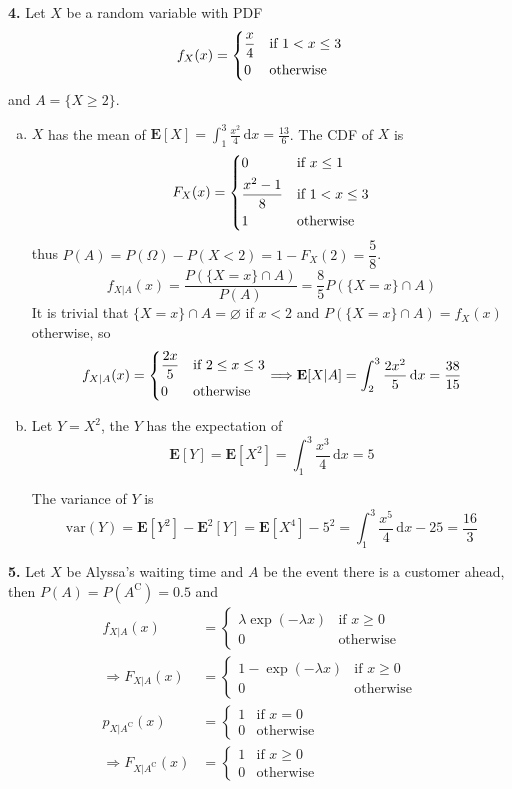 \documentclass[a4paper,12pt]{article}
\newcommand{\E}{\mathbf E}
\newcommand{\C}{\mathrm C}
\newcommand{\ud}{\,\mathrm{d}}
\newcommand{\var}{\mathrm{var}}
\newcommand{\exercise}[1]{\noindent\textbf{#1.}}
\begin{document}
\exercise 4  Let $X$ be a random variable with PDF
\[f_X(x) = \begin{dcases}
  \frac{x}{4} &\text{if }1 < x \le 3\\
  0 &\text{otherwise}
\end{dcases}\]
and $A = \{X \ge 2\}$.
\begin{enumerate}[(a)]
  \item $X$ has the mean of
    $\displaystyle\E[X] = \int_1^3\frac{x^2}{4}\ud x = \frac{13}{6}$.
    The CDF of $X$ is
    \[F_X(x) = \begin{dcases}
      0 &\text{if }x \le 1\\
      \frac{x^2 - 1}{8} &\text{if }1 < x \le 3\\
      1 &\text{otherwise}
    \end{dcases}\]
    thus $P(A) = P(\Omega) - P(X < 2) = 1 - F_X(2) = \dfrac{5}{8}$.
    \[f_{X|A}(x) = \frac{P(\{X = x\}\cap A)}{P(A)}
    = \frac{8}{5}P(\{X = x\}\cap A)\]
    It is trivial that $\{X = x\}\cap A = \varnothing$ if $x < 2$
    and $P(\{X = x\}\cap A) = f_X(x)$ otherwise, so
    \[f_{X|A}(x) = \begin{dcases}
      \frac{2x}{5} &\text{if }2 \le x \le 3\\
      0 &\text{otherwise}
    \end{dcases}
    \Longrightarrow \E[X|A] = \int_2^3\frac{2x^2}{5}\ud x = \frac{38}{15}\]
  \item Let $Y = X^2$, the $Y$ has the expectation of
    \[\E[Y] = \E\left[X^2\right] = \int_1^3\frac{x^3}{4}\ud x = 5\]

    The variance of $Y$ is
    \[\var(Y) = \E\left[Y^2\right] - \E^2[Y] = \E\left[X^4\right] - 5^2
    = \int_1^3\frac{x^5}{4}\ud x - 25 = \frac{16}{3}\]
\end{enumerate}

\exercise 5  Let $X$ be Alyssa's waiting time and $A$ be the event there is
a customer ahead, then $P(A) = P\left(A^\C\right) = 0.5$ and
\begin{align*}
  f_{X|A}(x) &= \begin{cases}
    \lambda\exp(-\lambda x) &\text{if }x \ge 0\\
    0 &\text{otherwise}
  \end{cases}\\
  \Longrightarrow F_{X|A}(x) &= \begin{cases}
    1 - \exp(-\lambda x) &\text{if }x \ge 0\\
    0 &\text{otherwise}
  \end{cases}\\
  p_{X|A^\C}(x) &= \begin{cases}
    1 &\text{if }x = 0\\
    0 &\text{otherwise}
  \end{cases}\\
  \Longrightarrow F_{X|A^\C}(x) &= \begin{cases}
    1 &\text{if }x \ge 0\\
    0 &\text{otherwise}
  \end{cases}
\end{align*}
\end{document}
